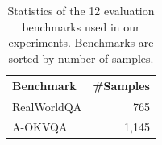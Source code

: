 
\begin{table}[h]
\centering
\caption{Statistics of the 12 evaluation benchmarks used in our experiments. Benchmarks are sorted by number of samples.}
\label{tab:dataset_stats}
\small
\begin{tabular}{lr}
\toprule
\textbf{Benchmark} & \textbf{\#Samples} \\
\midrule
RealWorldQA         &    765  \\
A-OKVQA~\cite{schwenk2022okvqa}               &  1,145  \\

\end{tabular}
\end{table}
